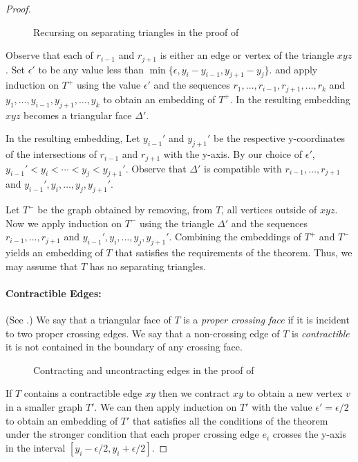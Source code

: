 \documentclass{patmorin}
\begin{document}
\begin{proof}
   \begin{figure}
      \caption{Recursing on separating triangles in the proof of
      }
   \end{figure}

   Observe that each of $r_{i-1}$ and $r_{j+1}$ is either an edge
   or vertex of the triangle $xyz$.  Set $\epsilon'$ to be any
   value less than $\min\{\epsilon,y_{i}-y_{i-1}, y_{j+1}-y_j\}$.
   and apply induction on $T^+$ using the value $\epsilon'$
   and the sequences $r_1,\ldots,r_{i-1},r_{j+1},\ldots,r_k$ and
   $y_1,\ldots,y_{i-1},y_{j+1},\ldots,y_k$ to obtain an embedding
   of $T^+$.  In the resulting embedding $xyz$ becomes a triangular face
   $\Delta'$.

   In the resulting embedding, Let $y_{i-1}'$ and $y_{j+1}'$
   be the respective y-coordinates of the intersections of
   $r_{i-1}$ and $r_{j+1}$ with the y-axis.  By our choice of
   $\epsilon'$, $y_{i-1}'<y_i<\cdots<y_j<y_{j+1}'$.  Observe that
   $\Delta'$ is compatible with $r_{i-1},\ldots,r_{j+1}$ and
   $y_{i-1}',y_i,\ldots,y_j,y_{j+1}'$.

   Let $T^-$ be the graph obtained by removing, from $T$, all
   vertices outside of $xyz$.  Now we apply induction on $T^-$ using
   the triangle $\Delta'$ and the sequences $r_{i-1},\ldots,r_{j+1}$ and
   $y_{i-1}',y_i,\ldots,y_{j},y_{j+1}'$.  Combining the embeddings of $T^+$
   and $T^-$ yields an embedding of $T$ that satisfies the requirements of
   the theorem.  Thus, we may assume that $T$ has no separating triangles.

   \paragraph{Contractible Edges:}
   (See .)
   We say that a triangular face of $T$ is a \emph{proper crossing
   face} if it is incident to two proper crossing edges.  We say that a
   non-crossing edge of $T$ is \emph{contractible} it is not contained
   in the boundary of any crossing face.  
   \begin{figure}
      \caption{Contracting and uncontracting edges in the proof of
      }
   \end{figure}

   If $T$ contains a contractible edge $xy$ then we contract $xy$ to
   obtain a new vertex $v$ in a smaller graph $T'$.   We can then apply
   induction on $T'$ with the value $\epsilon'=\epsilon/2$ to obtain an
   embedding of $T'$ that satisfies all the conditions of the theorem under
   the stronger condition that each proper crossing edge $e_i$ crosses
   the y-axis in the interval $[y_i-\epsilon/2,y_i+\epsilon/2]$.


\end{proof}
\end{document}
